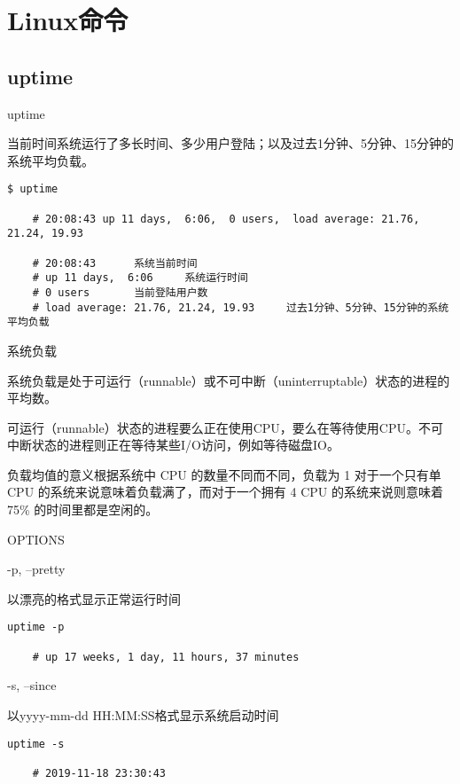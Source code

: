 \chapter{Linux命令}
\section{uptime}
\label{chap:linux_uptime}

uptime

当前时间系统运行了多长时间、多少用户登陆；以及过去1分钟、5分钟、15分钟的系统平均负载。

\begin{lstlisting}[language=cshell]
    $ uptime

    # 20:08:43 up 11 days,  6:06,  0 users,  load average: 21.76, 21.24, 19.93

    # 20:08:43      系统当前时间
    # up 11 days,  6:06     系统运行时间
    # 0 users       当前登陆用户数
    # load average: 21.76, 21.24, 19.93     过去1分钟、5分钟、15分钟的系统平均负载
\end{lstlisting}


系统负载

系统负载是处于可运行（runnable）或不可中断（uninterruptable）状态的进程的平均数。\par
可运行（runnable）状态的进程要么正在使用CPU，要么在等待使用CPU。不可中断状态的进程则正在等待某些I/O访问，例如等待磁盘IO。 \par
负载均值的意义根据系统中 CPU 的数量不同而不同，负载为 1 对于一个只有单 CPU 的系统来说意味着负载满了，而对于一个拥有 4 CPU 的系统来说则意味着 75\% 的时间里都是空闲的。


\par
OPTIONS

-p, --pretty \par
\qquad 以漂亮的格式显示正常运行时间

\begin{lstlisting}[language=cshell]
    uptime -p

    # up 17 weeks, 1 day, 11 hours, 37 minutes
\end{lstlisting}


-s, --since \par
\qquad 以yyyy-mm-dd HH:MM:SS格式显示系统启动时间

\begin{lstlisting}[language=cshell]
    uptime -s

    # 2019-11-18 23:30:43
\end{lstlisting}












